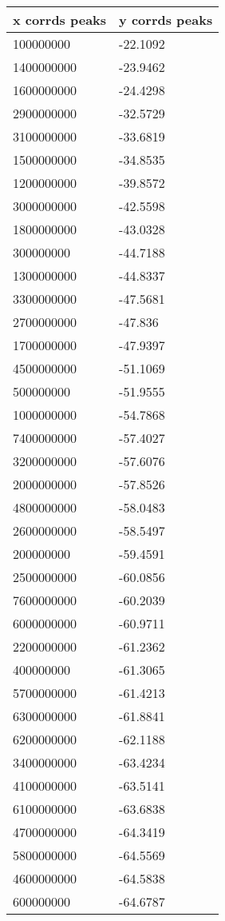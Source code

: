 \begin{tabular}{ll}
x corrds peaks & y corrds peaks \\ 
\hline 
100000000 & -22.1092 \\ 
1400000000 & -23.9462 \\ 
1600000000 & -24.4298 \\ 
2900000000 & -32.5729 \\ 
3100000000 & -33.6819 \\ 
1500000000 & -34.8535 \\ 
1200000000 & -39.8572 \\ 
3000000000 & -42.5598 \\ 
1800000000 & -43.0328 \\ 
300000000 & -44.7188 \\ 
1300000000 & -44.8337 \\ 
3300000000 & -47.5681 \\ 
2700000000 & -47.836 \\ 
1700000000 & -47.9397 \\ 
4500000000 & -51.1069 \\ 
500000000 & -51.9555 \\ 
1000000000 & -54.7868 \\ 
7400000000 & -57.4027 \\ 
3200000000 & -57.6076 \\ 
2000000000 & -57.8526 \\ 
4800000000 & -58.0483 \\ 
2600000000 & -58.5497 \\ 
200000000 & -59.4591 \\ 
2500000000 & -60.0856 \\ 
7600000000 & -60.2039 \\ 
6000000000 & -60.9711 \\ 
2200000000 & -61.2362 \\ 
400000000 & -61.3065 \\ 
5700000000 & -61.4213 \\ 
6300000000 & -61.8841 \\ 
6200000000 & -62.1188 \\ 
3400000000 & -63.4234 \\ 
4100000000 & -63.5141 \\ 
6100000000 & -63.6838 \\ 
4700000000 & -64.3419 \\ 
5800000000 & -64.5569 \\ 
4600000000 & -64.5838 \\ 
600000000 & -64.6787 \\ 

\end{tabular}
